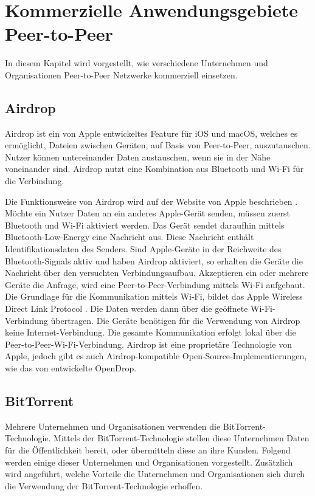 \chapter{Kommerzielle Anwendungsgebiete Peer-to-Peer}
\label{cha:Kommerziell}
In diesem Kapitel wird vorgestellt, wie verschiedene Unternehmen und Organisationen Peer-to-Peer Netzwerke kommerziell einsetzen. 

\section{Airdrop}
Airdrop ist ein von Apple entwickeltes Feature für iOS und macOS, welches es ermöglicht, Dateien zwischen Geräten, auf Basis von Peer-to-Peer,  auszutauschen. Nutzer können untereinander Daten austauschen, wenn sie in der Nähe voneinander sind. Airdrop nutzt eine Kombination aus Bluetooth und Wi-Fi für die Verbindung. 

Die Funktionsweise von Airdrop wird auf der Website von Apple beschrieben \parencite{appleAirdrop}. Möchte ein Nutzer Daten an ein anderes Apple-Gerät senden, müssen zuerst Bluetooth und Wi-Fi aktiviert werden. Das Gerät sendet daraufhin mittels Bluetooth-Low-Energy eine Nachricht aus. Diese Nachricht enthält Identifikationsdaten des Senders. Sind Apple-Geräte in der Reichweite des Bluetooth-Signals aktiv und haben Airdrop aktiviert, so erhalten die Geräte die Nachricht über den versuchten Verbindungsaufbau. Akzeptieren ein oder mehrere Geräte die Anfrage, wird eine Peer-to-Peer-Verbindung mittels Wi-Fi aufgebaut. Die Grundlage für die Kommunikation mittels Wi-Fi, bildet das Apple Wireless Direct Link Protocol \parencite{stute2018one}. Die Daten werden dann über die geöffnete Wi-Fi-Verbindung übertragen. Die Geräte benötigen für die Verwendung von Airdrop keine Internet-Verbindung. Die gesamte Kommunikation erfolgt lokal über die Peer-to-Peer-Wi-Fi-Verbindung. 
Airdrop ist eine proprietäre Technologie von Apple, jedoch gibt es auch Airdrop-kompatible Open-Source-Implementierungen, wie das von \textcite{openDrop} entwickelte OpenDrop. 

\section{BitTorrent}

Mehrere Unternehmen und Organisationen verwenden die BitTorrent-Technologie. Mittels der BitTorrent-Technologie stellen diese Unternehmen Daten für die Öffentlichkeit bereit, oder übermitteln diese an ihre Kunden. Folgend werden einige dieser Unternehmen und Organisationen vorgestellt. Zusätzlich wird angeführt, welche Vorteile die Unternehmen und Organisationen sich durch die Verwendung der BitTorrent-Technologie erhoffen.

